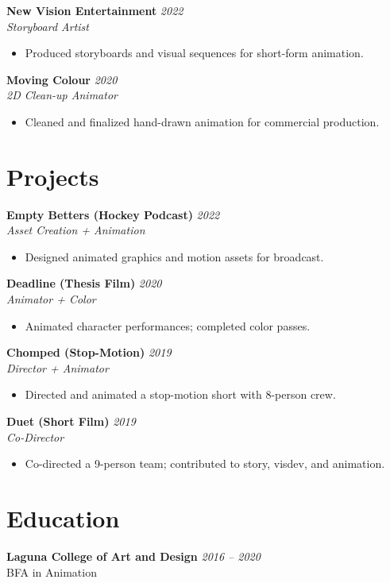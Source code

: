 \documentclass[11pt,letterpaper]{article}
\begin{document}
\textbf{New Vision Entertainment} \hfill \textit{2022}\\
\textit{Storyboard Artist}
\begin{itemize}
    \item Produced storyboards and visual sequences for short-form animation.
\end{itemize}

\textbf{Moving Colour} \hfill \textit{2020}\\
\textit{2D Clean-up Animator}
\begin{itemize}
    \item Cleaned and finalized hand-drawn animation for commercial production.
\end{itemize}

\section{Projects}

\textbf{Empty Betters (Hockey Podcast)} \hfill \textit{2022}\\
\textit{Asset Creation + Animation}
\begin{itemize}
    \item Designed animated graphics and motion assets for broadcast.
\end{itemize}

\textbf{Deadline (Thesis Film)} \hfill \textit{2020}\\
\textit{Animator + Color}
\begin{itemize}
    \item Animated character performances; completed color passes.
\end{itemize}

\textbf{Chomped (Stop-Motion)} \hfill \textit{2019}\\
\textit{Director + Animator}
\begin{itemize}
    \item Directed and animated a stop-motion short with 8-person crew.
\end{itemize}

\textbf{Duet (Short Film)} \hfill \textit{2019}\\
\textit{Co-Director}
\begin{itemize}
    \item Co-directed a 9-person team; contributed to story, visdev, and animation.
\end{itemize}

\section{Education}

\textbf{Laguna College of Art and Design} \hfill \textit{2016 -- 2020}\\
BFA in Animation

\end{document}
